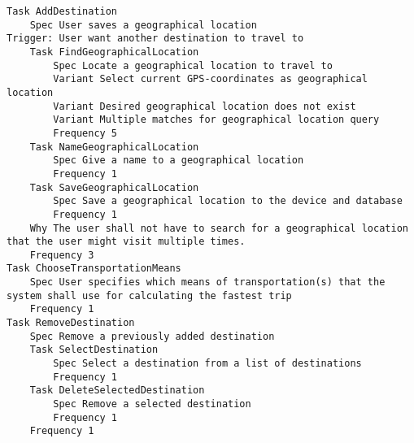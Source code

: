 

\begin{lstlisting}
Task AddDestination
	Spec User saves a geographical location
Trigger: User want another destination to travel to
	Task FindGeographicalLocation
		Spec Locate a geographical location to travel to
		Variant Select current GPS-coordinates as geographical location
		Variant Desired geographical location does not exist
		Variant Multiple matches for geographical location query
		Frequency 5
	Task NameGeographicalLocation
		Spec Give a name to a geographical location
		Frequency 1
	Task SaveGeographicalLocation
		Spec Save a geographical location to the device and database
		Frequency 1
	Why The user shall not have to search for a geographical location that the user might visit multiple times.
	Frequency 3
Task ChooseTransportationMeans
	Spec User specifies which means of transportation(s) that the system shall use for calculating the fastest trip
	Frequency 1
Task RemoveDestination
	Spec Remove a previously added destination
	Task SelectDestination
		Spec Select a destination from a list of destinations
		Frequency 1
	Task DeleteSelectedDestination
		Spec Remove a selected destination
		Frequency 1
	Frequency 1

\end{lstlisting}